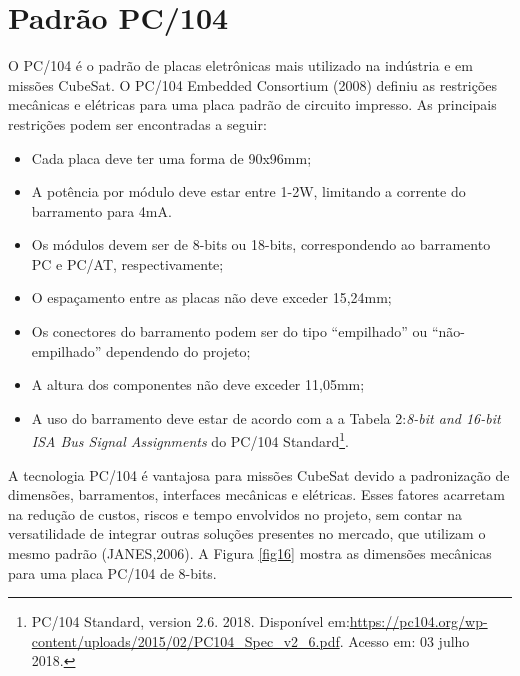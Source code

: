 \section{Padrão PC/104}

O PC/104 é o padrão de placas eletrônicas mais utilizado na indústria e em missões CubeSat. O PC/104 Embedded Consortium (2008) definiu as restrições mecânicas e elétricas para uma placa padrão de circuito impresso. As principais restrições podem ser encontradas a seguir:

\begin{itemize}
	\item Cada placa deve ter uma forma de 90x96mm;
	\item A potência por módulo deve estar entre 1-2W, limitando a corrente do barramento para 4mA.
	\item Os módulos devem ser de 8-bits ou 18-bits, correspondendo ao barramento PC e PC/AT, respectivamente;
	\item O espaçamento entre as placas não deve exceder 15,24mm;
	\item Os conectores do barramento podem ser do tipo “empilhado” ou “não-empilhado” dependendo do projeto;
	\item A altura dos componentes não deve exceder 11,05mm;
	\item A uso do barramento deve estar de acordo com a a Tabela 2:\textit{8-bit and 16-bit ISA Bus Signal Assignments} do PC/104 Standard\footnote{PC/104 Standard, version 2.6. 2018. Disponível em:\url{https://pc104.org/wp-content/uploads/2015/02/PC104_Spec_v2_6.pdf}. Acesso em: 03 julho 2018.}.
	
\end{itemize}

A tecnologia PC/104 é vantajosa para missões CubeSat devido a padronização de dimensões, barramentos, interfaces mecânicas e elétricas. Esses fatores acarretam na redução de custos, riscos e tempo envolvidos no projeto, sem contar na versatilidade de integrar outras soluções presentes no mercado, que utilizam o mesmo padrão (JANES,2006). A Figura \ref{fig16} mostra as dimensões mecânicas para uma placa PC/104 de 8-bits. 


